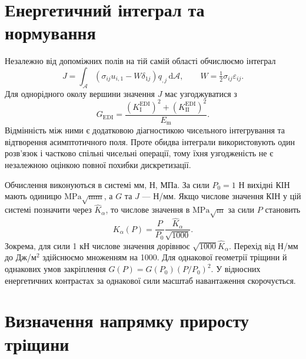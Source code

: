 \section{Енергетичний інтеграл та нормування}
\label{sec:methods-energy}

Незалежно від допоміжних полів на тій самій області обчислюємо інтеграл
\begin{equation}
 J=\int_{\mathcal A}
 \left(\sigma_{ij}u_{i,1}-W\delta_{1j}\right)
 q_{,j}\,\mathrm d\mathcal A,\qquad
 W=\tfrac12\sigma_{ij}\varepsilon_{ij}.
 \label{eq:method-J}
\end{equation}
Для однорідного околу вершини значення $J$ має узгоджуватися з
\begin{equation}
 G_{\mathrm{EDI}}=
 \frac{(K_{\mathrm I}^{\mathrm{EDI}})^2+
       (K_{\mathrm {II}}^{\mathrm{EDI}})^2}{E_{\mathrm m}}.
 \label{eq:method-G-edi}
\end{equation}
Відмінність між ними є додатковою діагностикою чисельного інтегрування та відтворення асимптотичного поля. Проте обидва інтеграли використовують один розв'язок і частково спільні чисельні операції, тому їхня узгодженість не є незалежною оцінкою повної похибки дискретизації.

Обчислення виконуються в системі мм, Н, МПа. За сили $P_0=1$ Н вихідні КІН мають одиницю $\mathrm{MPa}\sqrt{\mathrm{mm}}$, а $G$ та $J$ --- Н/мм. Якщо числове значення КІН у цій системі позначити через $\widehat K_\alpha$, то числове значення в $\mathrm{MPa}\sqrt{\mathrm m}$ за сили $P$ становить
\begin{equation}
 K_\alpha(P)=\frac{P}{P_0}\frac{\widehat K_\alpha}{\sqrt{1000}}.
 \label{eq:method-K-convert}
\end{equation}
Зокрема, для сили 1 кН числове значення дорівнює $\sqrt{1000}\widehat K_\alpha$. Перехід від Н/мм до Дж/м$^2$ здійснюємо множенням на 1000. Для однакової геометрії тріщини й однакових умов закріплення $G(P)=G(P_0)(P/P_0)^2$. У відносних енергетичних контрастах за однакової сили масштаб навантаження скорочується.

\section{Визначення напрямку приросту тріщини}
\label{sec:methods-mts}

